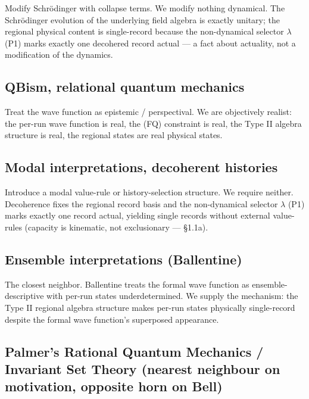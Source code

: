 \documentclass[11pt,a4paper]{article}
\begin{document}
Modify Schrödinger with collapse terms. We modify nothing dynamical. The Schrödinger evolution of the underlying field algebra is exactly unitary; the regional physical content is single-record because the non-dynamical selector $\lambda$ (P1) marks exactly one decohered record actual — a fact about actuality, not a modification of the dynamics.

\subsection{QBism, relational quantum mechanics}

Treat the wave function as epistemic / perspectival. We are objectively realist: the per-run wave function is real, the (FQ) constraint is real, the Type II algebra structure is real, the regional states are real physical states.

\subsection{Modal interpretations, decoherent histories}

Introduce a modal value-rule or history-selection structure. We require neither. Decoherence fixes the regional record basis and the non-dynamical selector $\lambda$ (P1) marks exactly one record actual, yielding single records without external value-rules (capacity is kinematic, not exclusionary — §1.1a).

\subsection{Ensemble interpretations (Ballentine)}

The closest neighbor. Ballentine treats the formal wave function as ensemble-descriptive with per-run states underdetermined. We supply the mechanism: the Type II regional algebra structure makes per-run states physically single-record despite the formal wave function's superposed appearance.

\subsection{Palmer's Rational Quantum Mechanics / Invariant Set Theory (nearest neighbour on motivation, opposite horn on Bell)}
\end{document}

